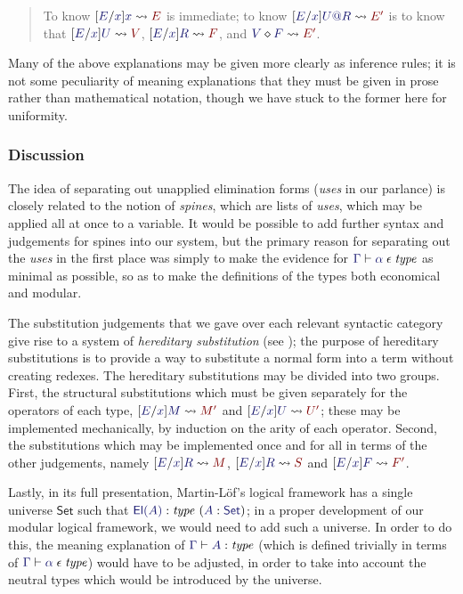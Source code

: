 \documentclass[main.tex]{subfiles}
\begin{document}
\begin{quote}
  To know $\hsubstrm{E}{x}{x}{E}$ is immediate; to know
$\hsubstrm{E}{x}{\elim{U}{R}}{E'}$ is to know that
$\hsubstu{E}{x}{U}{V}$, $\hsubstrm{E}{x}{R}{F}$, and $\eapply{V}{F}{E'}$.
\end{quote}\medskip

Many of the above explanations may be given more clearly as inference
rules; it is not some peculiarity of meaning explanations that they
must be given in prose rather than mathematical notation, though we
have stuck to the former here for uniformity.

\subsubsection{Discussion}

The idea of separating out unapplied elimination forms (\emph{uses} in
our parlance) is closely related to the notion of \emph{spines}, which
are lists of \emph{uses}, which may be applied all at once to
a variable. It would be possible to add further syntax and judgements
for spines into our system, but the primary reason for separating out
the \emph{uses} in the first place was simply to make the evidence for
$\lfsequent\Gamma\cantype{\alpha}$ as minimal as possible, so as to make the
definitions of the types both economical and modular.

The substitution judgements that we gave over each relevant syntactic category
give rise to a system of \emph{hereditary substitution} (see \cite{watkins});
the purpose of hereditary substitutions is to provide a way to substitute a
normal form into a term without creating redexes. The hereditary substitutions
may be divided into two groups. First, the structural substitutions which must
be given separately for the operators of each type, $\hsubstm{E}{x}{M}{M'}$ and
$\hsubstr{E}{x}{U}{U'}$; these may be implemented mechanically, by induction on
the arity of each operator. Second, the substitutions which may be implemented
once and for all in terms of the other judgements, namely
$\hsubstrm{E}{x}{R}{M}$, $\hsubstr{E}{x}{R}{S}$ and $\hsubste{E}{x}{F}{F'}$.

Lastly, in its full presentation, Martin-L\"of's logical framework has
a single universe $\mathsf{Set}$ such that
$\hyp{\type{\mathsf{El}(A)}}{\ofty{A}{\mathsf{Set}}}$; in a proper
development of our modular logical framework, we would need to add
such a universe. In order to do this, the meaning explanation of
$\lfsequent\Gamma\type{A}$ (which is defined trivially in terms of
$\lfsequent\Gamma\cantype\alpha$) would have to be adjusted, in order
to take into account the neutral types which would be introduced by
the universe.
\end{document}
